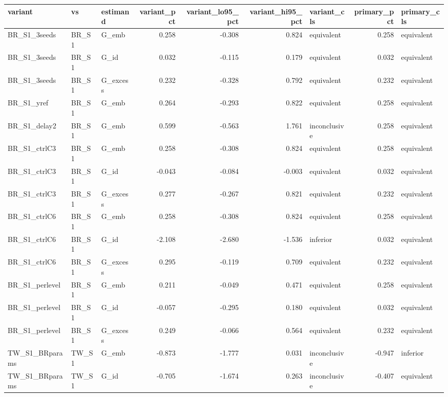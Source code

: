\begin{tabular}{lllrrrlrl}
\toprule
variant & vs & estimand & variant\_pct & variant\_lo95\_pct & variant\_hi95\_pct & variant\_cls & primary\_pct & primary\_cls \\
\midrule
BR\_S1\_3seeds & BR\_S1 & G\_emb & 0.258 & -0.308 & 0.824 & equivalent & 0.258 & equivalent \\
BR\_S1\_3seeds & BR\_S1 & G\_id & 0.032 & -0.115 & 0.179 & equivalent & 0.032 & equivalent \\
BR\_S1\_3seeds & BR\_S1 & G\_excess & 0.232 & -0.328 & 0.792 & equivalent & 0.232 & equivalent \\
BR\_S1\_yref & BR\_S1 & G\_emb & 0.264 & -0.293 & 0.822 & equivalent & 0.258 & equivalent \\
BR\_S1\_delay2 & BR\_S1 & G\_emb & 0.599 & -0.563 & 1.761 & inconclusive & 0.258 & equivalent \\
BR\_S1\_ctrlC3 & BR\_S1 & G\_emb & 0.258 & -0.308 & 0.824 & equivalent & 0.258 & equivalent \\
BR\_S1\_ctrlC3 & BR\_S1 & G\_id & -0.043 & -0.084 & -0.003 & equivalent & 0.032 & equivalent \\
BR\_S1\_ctrlC3 & BR\_S1 & G\_excess & 0.277 & -0.267 & 0.821 & equivalent & 0.232 & equivalent \\
BR\_S1\_ctrlC6 & BR\_S1 & G\_emb & 0.258 & -0.308 & 0.824 & equivalent & 0.258 & equivalent \\
BR\_S1\_ctrlC6 & BR\_S1 & G\_id & -2.108 & -2.680 & -1.536 & inferior & 0.032 & equivalent \\
BR\_S1\_ctrlC6 & BR\_S1 & G\_excess & 0.295 & -0.119 & 0.709 & equivalent & 0.232 & equivalent \\
BR\_S1\_perlevel & BR\_S1 & G\_emb & 0.211 & -0.049 & 0.471 & equivalent & 0.258 & equivalent \\
BR\_S1\_perlevel & BR\_S1 & G\_id & -0.057 & -0.295 & 0.180 & equivalent & 0.032 & equivalent \\
BR\_S1\_perlevel & BR\_S1 & G\_excess & 0.249 & -0.066 & 0.564 & equivalent & 0.232 & equivalent \\
TW\_S1\_BRparams & TW\_S1 & G\_emb & -0.873 & -1.777 & 0.031 & inconclusive & -0.947 & inferior \\
TW\_S1\_BRparams & TW\_S1 & G\_id & -0.705 & -1.674 & 0.263 & inconclusive & -0.407 & equivalent \\

\end{tabular}
